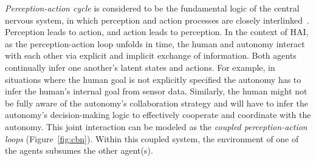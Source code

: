 \documentclass[12pt]{article}
\begin{document}
\textit{Perception-action cycle} is considered to be the fundamental logic of the central nervous system, in which perception and action processes are closely interlinked~\cite{cutsuridis2013cognitive}. Perception leads to action, and action leads to perception.
In the context of HAI, as the perception-action loop unfolds in time, 
the human and autonomy interact with each other via explicit and implicit exchange of information. Both agents continually infer one another's latent states and actions. For example, in situations where the human goal is not explicitly specified the autonomy has to infer the human's internal goal from sensor data. Similarly, the human might not be fully aware of the autonomy's collaboration strategy and will have to infer the autonomy's decision-making logic to effectively cooperate and coordinate with the autonomy. This joint interaction can be modeled as the \textit{coupled perception-action loops} (Figure~\ref{fig:cbn}). Within this coupled system, the environment of one of the agents subsumes the other agent(s).
\end{document}
